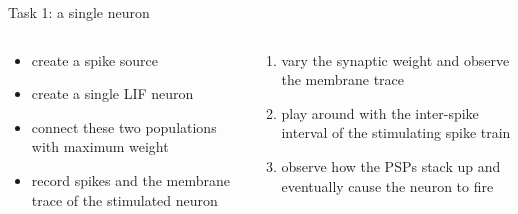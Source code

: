 \documentclass[aspectratio=169]{beamer}
\begin{document}
\begin{frame}{Task 1: a single neuron}
	\begin{columns}[onlytextwidth]
		\begin{column}{0.48\textwidth}
			\begin{center}
			\end{center}

			\begin{itemize}
				\item create a spike source
				\item create a single LIF neuron
				\item connect these two populations with maximum weight
				\item record spikes and the membrane trace of the stimulated neuron
			\end{itemize}
		\end{column}
		\hfill
		\begin{column}{0.48\textwidth}
			\begin{enumerate}
				\item vary the synaptic weight and observe the membrane trace
				\item play around with the inter-spike interval of the stimulating spike train
				\item observe how the PSPs stack up and eventually cause the neuron to fire
			\end{enumerate}
		\end{column}
	\end{columns}
\end{frame}
\end{document}
